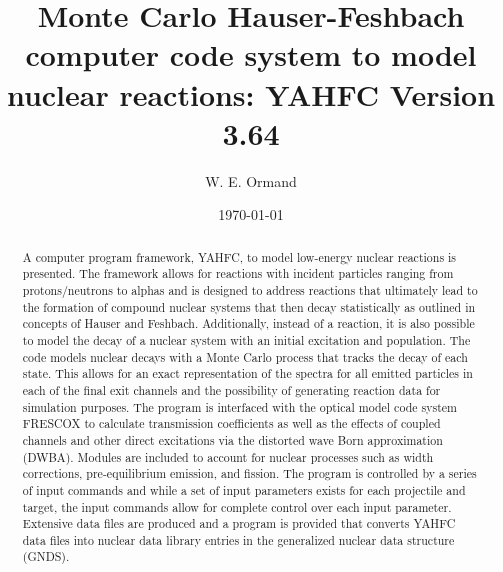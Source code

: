 \documentclass[
10pt,
showpacs,preprintnumbers,footinbib,
amsfonts,amsmath,amssymb,
aps,
prc,twocolumn,groupedaddress,superscriptaddress,
showkeys,
nofootinbib
]{revtex4-1}
\begin{document}
\title{Monte Carlo Hauser-Feshbach computer code system to model nuclear reactions: YAHFC  Version 3.64 }

\author{W. E. Ormand}

\date{\today}


\begin{abstract}
A computer program framework, YAHFC, to model low-energy nuclear reactions is presented. The framework allows for reactions with incident particles ranging from protons/neutrons to alphas and is designed to address reactions that ultimately lead to the formation of compound nuclear systems that then decay statistically as outlined in concepts of Hauser and Feshbach.  Additionally, instead of a reaction, it is also possible to model the decay of a nuclear system with an initial excitation and population. The code models nuclear decays with a Monte Carlo process that tracks the decay of each state. This allows for an exact representation of the spectra for all emitted particles in each of the final exit channels and the possibility of generating reaction data for simulation purposes. The program is interfaced with the optical model code system FRESCOX to calculate transmission coefficients as well as the effects of coupled channels and other direct excitations via the distorted wave Born approximation (DWBA). Modules are included to account for nuclear processes such as width corrections, pre-equilibrium emission, and fission. The program is controlled by a series of input commands and while a set of input parameters exists for each projectile and target, the input commands allow for complete control over each input parameter. Extensive data files are produced and a program is provided that converts YAHFC data files into nuclear data library entries in the generalized nuclear data structure (GNDS). 
\end{abstract}

\maketitle
\end{document}
